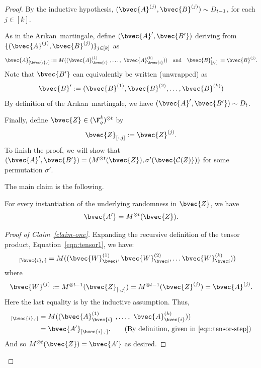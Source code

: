 \documentclass[11pt]{article}
\newcommand{\Arikan}{Ar\i kan}
\begin{document}
\begin{proof}
	By the inductive hypothesis,
	$(\bvec{A}^{(j)}, \bvec{B}^{(j)}) \sim D_{t-1}$, for each $j \in [k]$.
	
	As in the \Arikan~martingale, define
	$(\bvec{A}', \bvec{B'})$
	deriving from $\{(\bvec{A}^{(j)}, \bvec{B}^{(j)})\}_{j \in [k]}$ as
	\begin{equation}
		\label{eqn:tensor-step}
		\bvec{A}'_{[\bvec{i}, \cdot]}
		:=
		M((
		\bvec{A}^{(1)}_{\bvec{i} }
		~
		,\dots,
		~
		\bvec{A}^{(k)}_{\bvec{i}}
		))
		\quad
		\text{and}
		\quad
		\bvec{B}'_{[j, \cdot]} := \bvec{B}^{(j)}.
	\end{equation}
	Note that $\bvec{B'}$ can equivalently be written (unwrapped) as
	$$\bvec{B}' := (\bvec{B}^{(1)}, \bvec{B}^{(2)}, \ldots, \bvec{B}^{(k)})$$
	By definition of the \Arikan~martingale, we have
	$(\bvec{A}', \bvec{B'}) \sim D_t$.
	
	Finally, define $\bvec{Z} \in (\F_q^k)^{\otimes t}$ by
	\begin{equation}
	\label{eq:lsb-first}
\bvec{Z}_{[\cdot, j]} := \bvec{Z}^{(j)}.
	\end{equation}
	To finish the proof, we will show that
	$(\bvec{A}', \bvec{B'}) =
	(M^{\otimes t}(\bvec{Z}) , \sigma'(\bvec{\mathcal{C}(Z)}))$
	for some permutation $\sigma'$.
	
	The main claim is the following. 
	\begin{claim}
		\label{claim-one}
		For every instantiation of the underlying randomness in
		$\bvec{Z}$, we have
		$$\bvec{A'} =  M^{\otimes t}(\bvec{Z}).$$
	\end{claim}
	\begin{proof}[Proof of Claim~\ref{claim-one}]
		
		Expanding the recursive definition of the tensor product, Equation~\eqref{eqn:tensor1}, we have:
		\begin{align*}
			[M^{\otimes t}(\bvec{Z})]_{[\bvec{i}, \cdot]}
			&=  M((
			\bvec{W}_{\bvec i}^{(1)},
			\bvec{W}_{\bvec i}^{(2)},
			\dots
			\bvec{W}_{\bvec i}^{(k)}
			))
		\end{align*}
		where
		$$
		\bvec{W}^{(j)}
		:= M^{\otimes t-1}(\bvec{Z}_{[\cdot, j]})
		= M^{\otimes t-1}(\bvec{Z}^{(j)})
		= \bvec{A}^{(j)}.
		$$
		Here the last equality 
		is by the inductive assumption.
		Thus,
		\begin{align*}
			[M^{\otimes t}(\bvec{Z})]_{[\bvec{i}, \cdot]}
			&=
			M((
			\bvec{A}^{(1)}_{\bvec{i} }
			~
			,\dots,
			~
			\bvec{A}^{(k)}_{\bvec{i}}
			))\\
			&= \bvec{A'}_{[\bvec{i}, \cdot]}. \tag{By definition, given in \cref{eqn:tensor-step}}
		\end{align*}
		And so
		$M^{\otimes t}(\bvec{Z})=
		\bvec{A'}$ as desired.
	\end{proof}
	

\end{proof}
\end{document}
